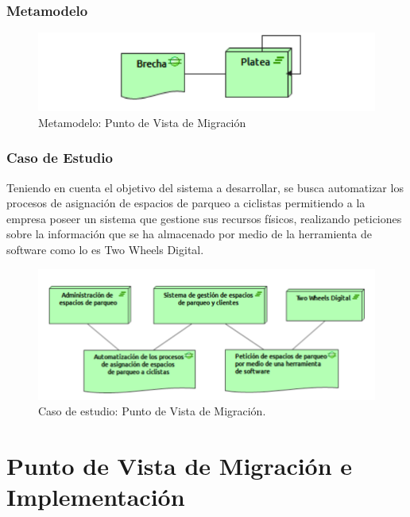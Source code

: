 \subsubsection{Metamodelo}
\begin{figure}[h]
	\centering
	\includegraphics[width=1.0\textwidth]{imagenes/Metamodelos/Migracion/meta_Migracion.pdf}
	\caption{Metamodelo: Punto de Vista de Migración}
	\label{fig:gap_analysis}
\end{figure}

\subsubsection{Caso de Estudio}
Teniendo en cuenta el objetivo del sistema a desarrollar, se busca automatizar los procesos de asignación de espacios de parqueo a ciclistas permitiendo a la empresa poseer un sistema que gestione sus recursos físicos, realizando peticiones sobre la información que se ha almacenado por medio de la herramienta de software como lo es Two Wheels Digital.

\begin{figure}[h]
	\centering
	\includegraphics[width=1.0\textwidth]{imagenes/Caso_Estudio/Migracion/Migracion.PDF}
	\caption{Caso de estudio: Punto de Vista de Migración.}
	\label{fig:gap_analysis}
\end{figure}

\section{Punto de Vista de Migración e Implementación}

